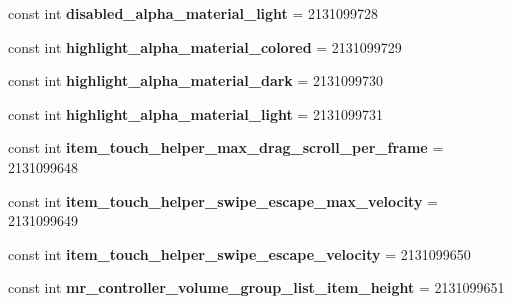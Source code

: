 \begin{DoxyCompactItemize}
const int {\bfseries disabled\+\_\+alpha\+\_\+material\+\_\+light} = 2131099728
\item 
\mbox{\label{class_pinned_app_1_1_droid_1_1_resource_1_1_dimension_a19767c9616070a393565f5cb22c80c21}} 
const int {\bfseries highlight\+\_\+alpha\+\_\+material\+\_\+colored} = 2131099729
\item 
\mbox{\label{class_pinned_app_1_1_droid_1_1_resource_1_1_dimension_af3ee82897cf80d8ec18e52db2fec4afd}} 
const int {\bfseries highlight\+\_\+alpha\+\_\+material\+\_\+dark} = 2131099730
\item 
\mbox{\label{class_pinned_app_1_1_droid_1_1_resource_1_1_dimension_a217f511c96c5223523a4e98ddf28a81b}} 
const int {\bfseries highlight\+\_\+alpha\+\_\+material\+\_\+light} = 2131099731
\item 
\mbox{\label{class_pinned_app_1_1_droid_1_1_resource_1_1_dimension_a618e38dca4b6c73e39010fc109e2cca8}} 
const int {\bfseries item\+\_\+touch\+\_\+helper\+\_\+max\+\_\+drag\+\_\+scroll\+\_\+per\+\_\+frame} = 2131099648
\item 
\mbox{\label{class_pinned_app_1_1_droid_1_1_resource_1_1_dimension_a93135486ba305cc475b71e7b0aa7e942}} 
const int {\bfseries item\+\_\+touch\+\_\+helper\+\_\+swipe\+\_\+escape\+\_\+max\+\_\+velocity} = 2131099649
\item 
\mbox{\label{class_pinned_app_1_1_droid_1_1_resource_1_1_dimension_a24367d333695bc551d1826a0989e4403}} 
const int {\bfseries item\+\_\+touch\+\_\+helper\+\_\+swipe\+\_\+escape\+\_\+velocity} = 2131099650
\item 
\mbox{\label{class_pinned_app_1_1_droid_1_1_resource_1_1_dimension_a0ac72ea8c60ad6456d57eab0fc247a76}} 
const int {\bfseries mr\+\_\+controller\+\_\+volume\+\_\+group\+\_\+list\+\_\+item\+\_\+height} = 2131099651
\item 
\mbox{\label{class_pinned_app_1_1_droid_1_1_resource_1_1_dimension_a1e6a00ded4bb1b6044c8f809521f2b2e}} 

\end{DoxyCompactItemize}
